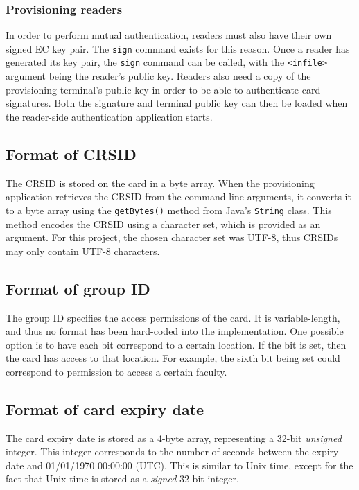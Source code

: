 \documentclass[12pt,a4paper,twoside,openright]{report}
\begin{document}
\subsubsection{Provisioning readers}

In order to perform mutual authentication, readers must also have their own signed EC key pair. The \texttt{sign} command exists for this reason. Once a reader has generated its key pair, the \texttt{sign} command can be called, with the \texttt{<infile>} argument being the reader's public key. Readers also need a copy of the provisioning terminal's public key in order to be able to authenticate card signatures. Both the signature and terminal public key can then be loaded when the reader-side authentication application starts.

\subsection{Format of CRSID}

The CRSID is stored on the card in a byte array. When the provisioning application retrieves the CRSID from the command-line arguments, it converts it to a byte array using the \texttt{getBytes()} method from Java's \texttt{String} class. This method encodes the CRSID using a character set, which is provided as an argument. For this project, the chosen character set was UTF-8, thus CRSIDs may only contain UTF-8 characters.

\subsection{Format of group ID}

The group ID specifies the access permissions of the card. It is variable-length, and thus no format has been hard-coded into the implementation. One possible option is to have each bit correspond to a certain location. If the bit is set, then the card has access to that location. For example, the sixth bit being set could correspond to permission to access a certain faculty.

\subsection{Format of card expiry date}

The card expiry date is stored as a 4-byte array, representing a 32-bit \emph{unsigned} integer. This integer corresponds to the number of seconds between the expiry date and 01/01/1970 00:00:00 (UTC). This is similar to Unix time, except for the fact that Unix time is stored as a \emph{signed} 32-bit integer.
\end{document}
